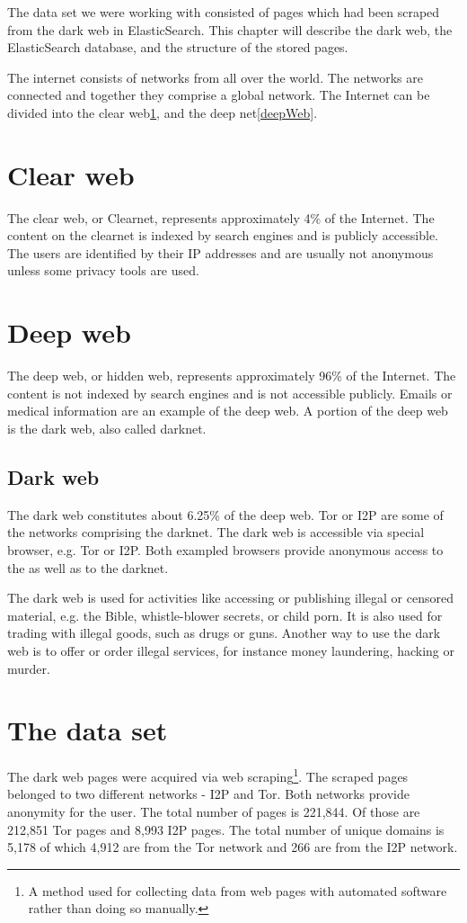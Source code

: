 The data set we were working with consisted of pages which had been scraped from the dark web in ElasticSearch. This chapter will describe the dark web, the ElasticSearch database, and the structure of the stored pages.

The internet consists of networks from all over the world. The networks are connected and together they comprise a global network. The Internet can be divided into the clear web\ref{clearWeb}, and the deep net\ref{deepWeb}.

\section{Clear web} \label{clearWeb}
The clear web, or Clearnet, represents approximately 4\% of the Internet. The content on the clearnet is indexed by search engines and is publicly accessible. The users are identified by their IP addresses and are usually not anonymous unless some privacy tools are used.

\section{Deep web} \label{deebWeb}
The deep web, or hidden web, represents approximately 96\% of the Internet. The content is not indexed by search engines and is not accessible publicly. Emails or medical information are an example of the deep web. A portion of the deep web is the dark web, also called darknet. 

\subsection{Dark web} \label{darkWeb}
The dark web constitutes about 6.25\% of the deep web. Tor \cite{torIntro} or I2P \cite{i2pIntro} are some of the networks comprising the darknet. The dark web is accessible via special browser, e.g. Tor or I2P. Both exampled browsers provide anonymous access to the as well as to the darknet. 

The dark web is used for activities like accessing or publishing illegal or censored material, e.g. the Bible, whistle-blower secrets, or child porn. It is also used for trading with illegal goods, such as drugs or guns. Another way to use the dark web is to offer or order illegal services, for instance money laundering, hacking or murder.

\section{The data set} \label{dataSet}
The dark web pages were acquired via web scraping\footnote{A method used for collecting data from web pages with automated software rather than doing so manually.}. The scraped pages belonged to two different networks - I2P  and Tor. Both networks provide anonymity for the user. The total number of pages is 221,844. Of those are 212,851 Tor pages and 8,993 I2P pages. The total number of unique domains is 5,178 of which 4,912 are from the Tor network and 266 are from the I2P network. 

